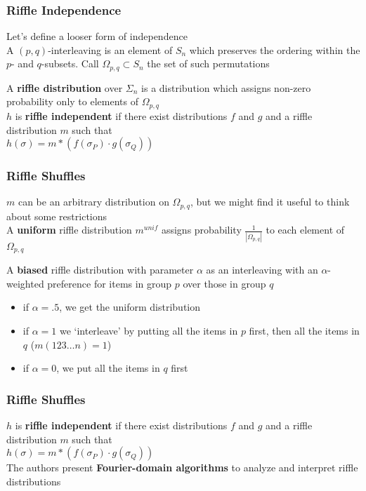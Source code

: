 \documentclass{beamer} %
\theoremstyle{definition} %
\def \pausenl {\pause $ \ $\\}
\begin{document}
\begin{frame}
	\frametitle{Riffle Independence}
	
	Let's define a looser form of independence\\
	
	
	\pausenl
	
	A $(p,q)$-interleaving is an element of $S_n$ which preserves the ordering within the $p$- and $q$-subsets.  Call $\Omega_{p,q}\subset S_n$ the set of such permutations
	
	\pausenl
	
	A \textbf{riffle distribution} over $\Sigma_n$ is a distribution which assigns non-zero probability only to elements of $\Omega_{p,q}$\\
	\pausenl
	
	$h$ is \textbf{riffle independent} if there exist distributions $f$ and $g$ and a riffle distribution $m$ such that\\
	$h(\sigma) = m \ast (f(\sigma_P)\cdot g(\sigma_Q))$\\
	
	
\end{frame}

\begin{frame}
	\frametitle{Riffle Shuffles}
	
	$m$ can be an arbitrary distribution on $\Omega_{p,q}$, but we might find it useful to think about some restrictions\\
	
	
	\pausenl
	
	A \textbf{uniform} riffle distribution $m^{unif}$ assigns probability $\frac{1}{|\Omega_{p,q}|}$ to each element of $\Omega_{p,q}$
	
	\pausenl
	
	A \textbf{biased} riffle distribution with parameter $\alpha$ as an interleaving with an $\alpha$-weighted preference for items in group $p$ over those in group $q$
	\pausenl
	\begin{itemize}
		\item if $\alpha = .5$, we get the uniform distribution
		\item if $\alpha = 1$ we `interleave' by putting all the items in $p$ first, then all the items in $q$ ($m(123\dots n) = 1$)
		\item if $\alpha = 0$, we put all the items in $q$ first
	\end{itemize}

\end{frame}

\begin{frame}
	\frametitle{Riffle Shuffles}
	
	
	
	$h$ is \textbf{riffle independent} if there exist distributions $f$ and $g$ and a riffle distribution $m$ such that\\
	$h(\sigma) = m \ast (f(\sigma_P)\cdot g(\sigma_Q))$\\
	
	\pausenl
	
	The authors present \textbf{Fourier-domain algorithms} to analyze and interpret riffle distributions\\
	
\end{frame}
\end{document}
